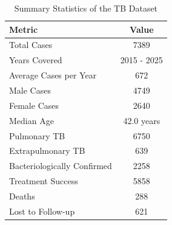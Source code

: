 \begin{table}[htbp]

\caption{Summary Statistics of the TB Dataset}
\label{tab:summary_statistics}
\begin{tabular}{lc}

\toprule

Metric & Value \\

\midrule

Total Cases & 7389 \\
Years Covered & 2015 - 2025 \\
Average Cases per Year & 672 \\
Male Cases & 4749 \\
Female Cases & 2640 \\
Median Age & 42.0 years \\
Pulmonary TB & 6750 \\
Extrapulmonary TB & 639 \\
Bacteriologically Confirmed & 2258 \\
Treatment Success & 5858 \\
Deaths & 288 \\
Lost to Follow-up & 621 \\

\bottomrule

\end{tabular}

\end{table}